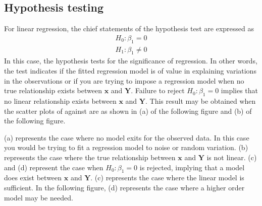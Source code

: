 \documentclass[11pt]{article}
\theoremstyle{remark}
\begin{document}
\pagebreak
\subsection{Hypothesis testing}
For linear regression, the chief statements of the hypothesis test are expressed as
\begin{eqnarray}
H_0: \beta_1 = 0\nonumber\\
H_1: \beta_1 \ne 0
\end{eqnarray}
In this case, the hypothesis tests for the significance of regression. In other words, the test indicates if the fitted regression model is of value in explaining variations in the observations or if you are trying to impose a regression model when no true relationship exists between $\mathbf{x}$ and $\mathbf{Y}$. Failure to reject $H_0: \beta_1 = 0$ implies that no linear relationship exists between $\mathbf{x}$ and $\mathbf{Y}$. This result may be obtained when the scatter plots of against are as shown in (a) of the following figure and (b) of the following figure.

\begin{figure}[h]
      \end{figure}

(a) represents the case where no model exits for the observed data. In this case you would be trying to fit a regression model to noise or random variation. (b) represents the case where the true relationship between $\mathbf{x}$ and $\mathbf{Y}$ is not linear. (c) and (d) represent the case when $H_0: \beta_1 = 0$ is rejected, implying that a model does exist between $\mathbf{x}$ and $\mathbf{Y}$. (c) represents the case where the linear model is sufficient. In the following figure, (d) represents the case where a higher order model may be needed.
\end{document}
